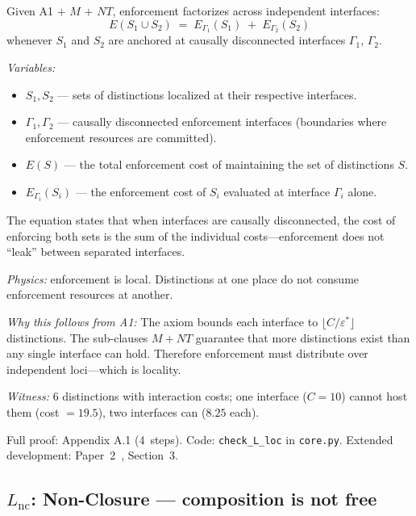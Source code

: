 \documentclass[11pt]{article}
\begin{document}
\begin{tcolorbox}[apfbox, title={Lemma $L_{\mathrm{loc}}$ (Locality)}]
Given A1 $+$ $M$ $+$ $NT$, enforcement factorizes across independent interfaces:
\begin{equation}
E(S_1 \cup S_2) \;=\; E_{\Gamma_1}(S_1) \;+\; E_{\Gamma_2}(S_2)
\end{equation}
whenever $S_1$ and $S_2$ are anchored at causally disconnected interfaces $\Gamma_1$, $\Gamma_2$.

\smallskip\noindent\textit{Variables:}
\begin{itemize}[nosep,leftmargin=2em]
\item $S_1, S_2$ --- sets of distinctions localized at their respective interfaces.
\item $\Gamma_1, \Gamma_2$ --- causally disconnected enforcement interfaces (boundaries where enforcement resources are committed).
\item $E(S)$ --- the total enforcement cost of maintaining the set of distinctions $S$.
\item $E_{\Gamma_i}(S_i)$ --- the enforcement cost of $S_i$ evaluated at interface $\Gamma_i$ alone.
\end{itemize}

\smallskip\noindent
The equation states that when interfaces are causally disconnected, the cost of enforcing both sets is the sum of the individual costs---enforcement does not ``leak'' between separated interfaces.
\end{tcolorbox}

\textit{Physics:} enforcement is local.  Distinctions at one place do not consume enforcement resources at another.

\textit{Why this follows from A1:} The axiom bounds each interface to $\lfloor C/\varepsilon^* \rfloor$ distinctions.  The sub-clauses $M + NT$ guarantee that more distinctions exist than any single interface can hold.  Therefore enforcement must distribute over independent loci---which is locality.

\textit{Witness:} 6 distinctions with interaction costs; one interface ($C=10$) cannot host them (cost $= 19.5$), two interfaces can ($8.25$ each).

Full proof: Appendix A.1 (4~steps).  Code: \texttt{check\_L\_loc} in \texttt{core.py}.  Extended development: Paper~2~\cite{P2}, Section~3.


\subsection{\texorpdfstring{$L_{\mathrm{nc}}$}{Lnc}: Non-Closure --- composition is not free}
\end{document}
